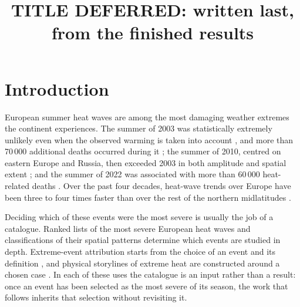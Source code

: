 \documentclass{amsdraft}
\title{TITLE DEFERRED: written last, from the finished results}
\affiliation{Memorial University of Newfoundland, St. John's,
Newfoundland and Labrador, Canada}
\begin{document}
\maketitle


\section{Introduction}
\label{sec:intro}


European summer heat waves are among the most damaging weather extremes the
continent experiences. The summer of 2003 was statistically extremely
unlikely even when the observed warming is taken into account
\citep{Schar2004}, and more than 70\,000 additional deaths occurred during it
\citep{Robine2008}; the summer of 2010, centred on eastern Europe and Russia,
then exceeded 2003 in both amplitude and spatial extent
\citep{Barriopedro2011}; and the summer of 2022 was associated with more than
60\,000 heat-related deaths \citep{Ballester2023}. Over the past four decades,
heat-wave trends over Europe have been three to four times faster than over
the rest of the northern midlatitudes \citep{Rousi2022}.

Deciding which of these events were the most severe is usually the job of a
catalogue. Ranked lists of the most severe European heat waves
\citep{Russo2015,Becker2022} and classifications of their spatial patterns
\citep{Stefanon2012} determine which events are studied in depth.
Extreme-event attribution starts from the choice of an event and its
definition \citep{Philip2020}, and physical storylines of extreme heat are
constructed around a chosen case \citep{WhittakerDiLuca2026}. In each of these
uses the catalogue is an input rather than a result: once an event has been
selected as the most severe of its season, the work that follows inherits
that selection without revisiting it.
\end{document}
